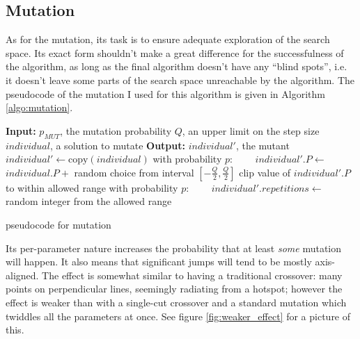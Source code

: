 \documentclass[times, utf8, diplomski]{fer}
\begin{document}
\subsection{Mutation}
As for the mutation, its task is to ensure adequate exploration of the search
space. Its exact form shouldn't make a great difference for the successfulness
of the algorithm, as long as the final algorithm doesn't have any ``blind spots'',
i.e. it doesn't leave some parts of the search space unreachable by the algorithm.
The pseudocode of the mutation I used for this algorithm is given in Algorithm \ref{algo:mutation}.

\begin{algorithm}[!htbp]
    \small
    \begin{algorithmic}
        \STATE \textbf{Input:} $p_{MUT}$, the mutation probability
        \STATE \textbf{\hphantom{Input:}} $Q$, an upper limit on the step size
        \STATE \textbf{\hphantom{Input:}} $individual$, a solution to mutate
        \STATE \textbf{Output:} $individual'$, the mutant
        \STATE $individual' \gets \text{copy}(individual)$
            \STATE with probability $p$:
            \STATE ~~~~$individual'.P \gets $ $individual.P + $ random choice from interval $[-\frac{Q}{2}, \frac{Q}{2}]$
            \STATE clip value of $individual'.P$ to within allowed range
        \ENDFOR
        \STATE with probability $p$:
        \STATE ~~~~$individual'.repetitions \gets $ random integer from the allowed range
    \end{algorithmic}
    \caption{pseudocode for mutation}
    \label{algo:mutation}
\end{algorithm}


Its per-parameter nature increases the probability that at least \emph{some}
mutation will happen. It also means that significant jumps will tend to be mostly
axis-aligned. The effect is somewhat similar to having a traditional crossover:
many points on perpendicular lines, seemingly radiating from a hotspot; however
the effect is weaker than with a single-cut crossover and a standard mutation
which twiddles all the parameters at once. See figure \ref{fig:weaker_effect}
for a picture of this.
\end{document}
